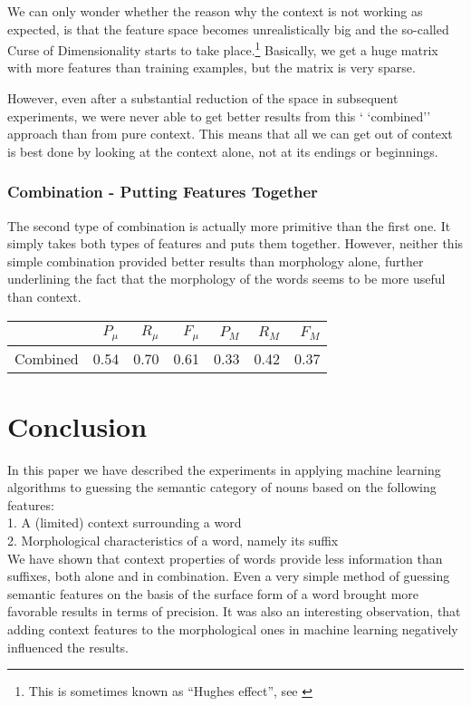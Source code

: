 \documentclass[letterpaper]{article}
\begin{document}
We can only wonder whether the reason why the context is not working as expected, is that the feature space becomes unrealistically big and the so-called Curse of Dimensionality starts to take place.\footnote{This is sometimes known as ``Hughes effect'', see \cite{hughes:1968}} Basically, we get a huge matrix with more features than training examples, but the matrix is very sparse.
 
However, even after a substantial reduction of the space in subsequent experiments, we were never able to get better results from this `
`combined'' approach than from pure context. This means that all we can get out of context 
is best done by looking at the context alone, not at its endings or beginnings.




\subsubsection{Combination - Putting Features Together}
The second type of combination is actually more primitive than the first one. It simply takes both types of features and puts them together. 
However, neither this simple combination provided better results than morphology alone, 
further underlining the fact that the morphology of the words
seems to be more useful than context.

\begin{tabular}{|r|r|r|r|r|r|r|}
 \hline
 & $P_\mu$ & $R_\mu$ & $F_\mu$ & $P_M$ & $R_M$  & $F_M$ \\ \hline
Combined & 0.54 & 0.70 & 0.61 & 0.33 & 0.42 & 0.37 \\ \hline
\end{tabular}



\section{Conclusion}
In this paper we have described the experiments in applying machine learning algorithms
to guessing the semantic category of nouns based on the following features:\\
1. A (limited) context surrounding a word  \\
2. Morphological characteristics of a word, namely its suffix\\

We have shown that context properties of words
provide less information than suffixes, both alone and in combination. 
Even a very simple method of guessing semantic features on the
basis of the surface form of a word brought more favorable %
results in terms of precision. It was also an interesting observation, that
adding context features to the morphological ones in machine learning
negatively influenced the results.
\end{document}
